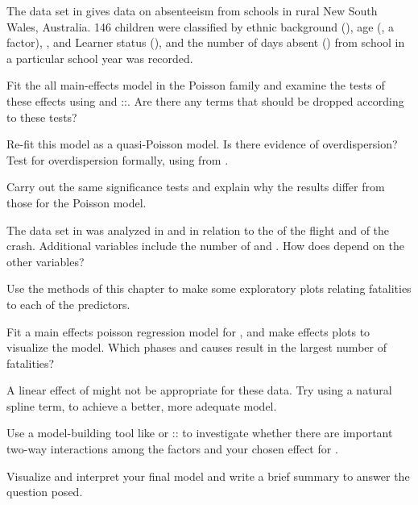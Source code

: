 \documentclass[11pt]{report}\usepackage[]{graphicx}\usepackage[]{color}
\begin{document}
\begin{Exercises}
  
  \exercise The data set  in  gives data on absenteeism from schools in rural New South Wales, Australia.
   146 children were classified by ethnic background (), age (, a factor), , and Learner status (),
   and the number of days absent () from school
   in a particular school year was recorded.
   \begin{enumerate*}
    \item Fit the all main-effects model in the Poisson family and examine the tests of these effects using
     and ::.  Are there any terms that should be dropped according to these tests?
    \item Re-fit this model as a quasi-Poisson model.  Is there evidence of overdispersion?
    Test for overdispersion formally, using  from .
    \item Carry out the same significance tests and explain why the results differ from those for the Poisson model.
   \end{enumerate*}

  \exercise The data set  in  was analyzed in  and 
  in relation to the  of the flight and  of the crash.  Additional variables include the number of 
   and .  How does  depend on the other variables?
  \begin{enumerate*}
    \item Use the methods of this chapter to make some exploratory plots relating fatalities to each of the predictors.
    \item Fit a main effects poisson regression model for , and make effects plots to visualize the model.
    Which phases and causes result in the largest number of fatalities?
    \item A linear effect of  might not be appropriate for these data.  Try using a natural spline term,
     to achieve a better, more adequate model.
    \item Use a model-building tool like  or :: to investigate whether there
    are important two-way interactions among the factors and your chosen effect for .
    \item Visualize and interpret your final model and write a brief summary to answer the question posed.
  \end{enumerate*}
  

\end{Exercises}
\end{document}
